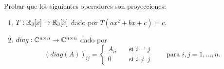 \item Probar que los siguientes operadores son proyecciones:
    \begin{enumerate}
        \item $T:\mathbb{R}_3[x]\to\mathbb{R}_3[x]$ dado por $T(ax^2+bx+c)=c$.
            \begin{mdframed}[style=s]
                
            \end{mdframed}
        \item $diag:\mathbb{C}^{n\times n}\to\mathbb{C}^{n\times n}$ dado por\[(diag(A))_{ij}=\begin{cases}
                A_{ii}&\quad\text{si }i=j\\
                0&\quad\text{si }i\neq j
            \end{cases}\qquad\text{para }i,j=1,\dots,n.\]
            \begin{mdframed}[style=s]
                
            \end{mdframed}
    \end{enumerate}